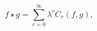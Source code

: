\begin{equation}
        \label{eq:starproduct}
        f \star g = \sum_{r=0}^\infty \lambda^r C_r(f,g),
    \end{equation}

